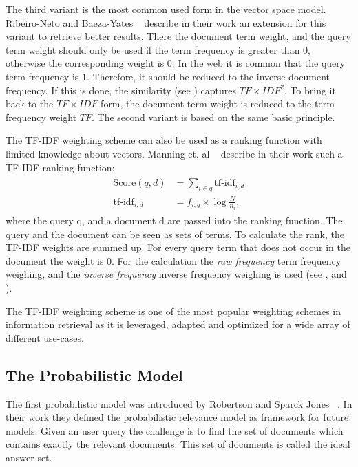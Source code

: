 The third variant is the most common used form in the vector space model. Ribeiro-Neto and Baeza-Yates ~\cite{ModernInvormationRetrieval1999} describe in their work an extension for this variant to retrieve better results. There the document term weight, and the query term weight should only be used if the term frequency is greater than $0$, otherwise the corresponding weight is $0$. In the web it is common that the query term frequency is $1$. Therefore, it should be reduced to the inverse document frequency. If this is done, the similarity (see ) captures $TF \times IDF^2$. To bring it back to the $TF \times IDF$ form, the document term weight is reduced to the term frequency weight $TF$. The second variant is based on the same basic principle.

The TF-IDF weighting scheme can also be used as a ranking function with limited knowledge about vectors. Manning et. al ~\cite{manning2008} describe in their work such a TF-IDF ranking function:
\begin{align}
  \begin{split}
    \text{Score}(q, d) & = \sum_{i \in q} \text{tf-idf}_{i, d} \\
    \text{tf-idf}_{i, d} & = f_{i, q} \times \log \frac{N}{n_i},
  \end{split}
\end{align}
where the query q, and a document d are passed into the ranking function. The query and the document can be seen as sets of terms. To calculate the rank, the TF-IDF weights are summed up. For every query term that does not occur in the document the weight is $0$. For the calculation the \textit{raw frequency} term frequency weighing, and the \textit{inverse frequency} inverse frequency weighing is used (see , and ). 

The TF-IDF weighting scheme is one of the most popular weighting schemes in information retrieval as it is leveraged, adapted and optimized for a wide array of different use-cases.

\subsection{The Probabilistic Model}
\label{sec:the_probabilistic_model}

The first probabilistic model was introduced by Robertson and Sparck Jones ~\cite{Robertson1976}. In their work they defined the probabilistic relevance model as framework for future models. Given an user query the challenge is to find the set of documents which contains exactly the relevant documents. This set of documents is called the ideal answer set.

